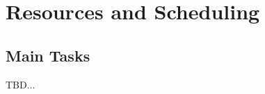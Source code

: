 \section{Resources and Scheduling}
\label{sec:resources_scheduling}

\subsection{Main Tasks}

TBD...

%


